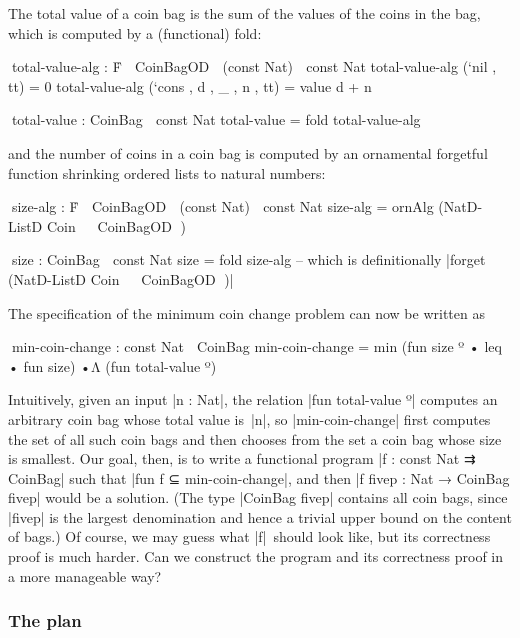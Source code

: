 The total value of a coin bag is the sum of the values of the coins in the bag, which is computed by a (functional) fold:
\begin{code}
^^^total-value-alg : Ḟ ⌊ CoinBagOD ⌋ (const Nat) ⇉ const Nat
total-value-alg (`nil   ,              tt) = 0
total-value-alg (`cons  , d , _ , n ,  tt) = value d + n

^^^total-value : CoinBag ⇉ const Nat
total-value = fold total-value-alg
\end{code}
and the number of coins in a coin bag is computed by an ornamental forgetful function shrinking ordered lists to natural numbers:
\begin{code}
^^^size-alg : Ḟ ⌊ CoinBagOD ⌋ (const Nat) ⇉ const Nat
size-alg = ornAlg (NatD-ListD Coin ⊙ ⌈ CoinBagOD ⌉)

^^^size : CoinBag ⇉ const Nat
size = fold size-alg
-- which is definitionally |forget (NatD-ListD Coin ⊙ ⌈ CoinBagOD ⌉)|
\end{code}
The specification of the minimum coin change problem can now be written as
\begin{code}
^^^min-coin-change : const Nat ↝ CoinBag
min-coin-change = min (fun size º • leq • fun size) •Λ (fun total-value º)
\end{code}
Intuitively, given an input |n : Nat|, the relation |fun total-value º| computes an arbitrary coin bag whose total value is~|n|, so |min-coin-change| first computes the set of all such coin bags and then chooses from the set a coin bag whose size is smallest.
Our goal, then, is to write a functional program |f : const Nat ⇉ CoinBag| such that |fun f ⊆ min-coin-change|, and then |f {fivep} : Nat → CoinBag fivep| would be a solution.
(The type |CoinBag fivep| contains all coin bags, since |fivep| is the largest denomination and hence a trivial upper bound on the content of bags.)
Of course, we may guess what |f|~should look like, but its correctness proof is much harder.
Can we construct the program and its correctness proof in a more manageable way?

\subsubsection{The plan}

